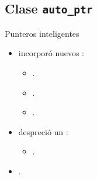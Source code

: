\subsection{Clase \bf\texttt{auto\_ptr}}

\begin{frame}[t]{Punteros inteligentes}
\begin{itemize}
  \item {} incorporó nuevos :
    \begin{itemize}
      \item {}.
      \item {}.
      \item {}.
    \end{itemize}

  \vfill
  \item {} despreció un :
    \begin{itemize}
      \item {}.
    \end{itemize}

  \vfill\pause
  \item {}  .
\end{itemize}
\end{frame}
